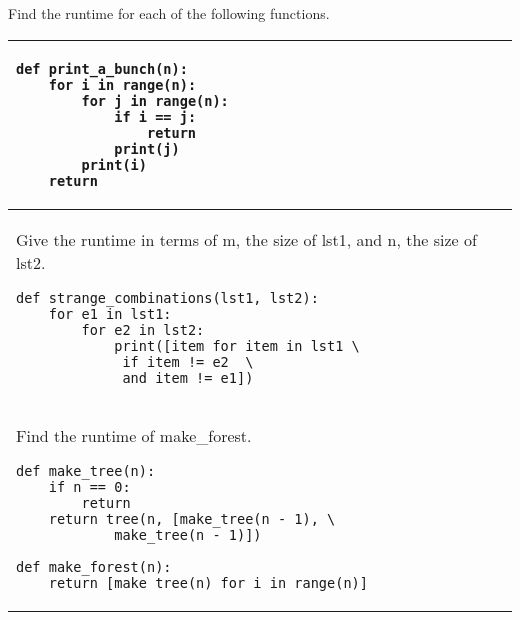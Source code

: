 \begin{blocksection}
\question Find the runtime for each of the following functions. \\

\begin{center}
\begin{tabular}{ |p{13cm}|p{2cm}| }
\hline
\begin{lstlisting}
def print_a_bunch(n):
    for i in range(n):
        for j in range(n):
            if i == j:
                return
            print(j)
        print(i)
    return
\end{lstlisting} &  \\  \hline

\vspace{\baselineskip}
Give the runtime in terms of m, the size of lst1, and n, the size of lst2. 
\vspace{\baselineskip}
\begin{lstlisting}
def strange_combinations(lst1, lst2):
    for e1 in lst1:
        for e2 in lst2:
            print([item for item in lst1 \
			 if item != e2  \
			 and item != e1])
\end{lstlisting} &  \\  \hline

\vspace{\baselineskip}
Find the runtime of make\_forest.
\vspace{\baselineskip}
\begin{lstlisting}
def make_tree(n):
    if n == 0:
        return
    return tree(n, [make_tree(n - 1), \
		    make_tree(n - 1)])

def make_forest(n):
    return [make_tree(n) for i in range(n)]
\end{lstlisting} &  \\  \hline
\end{tabular}
\end{center}

\end{blocksection}
